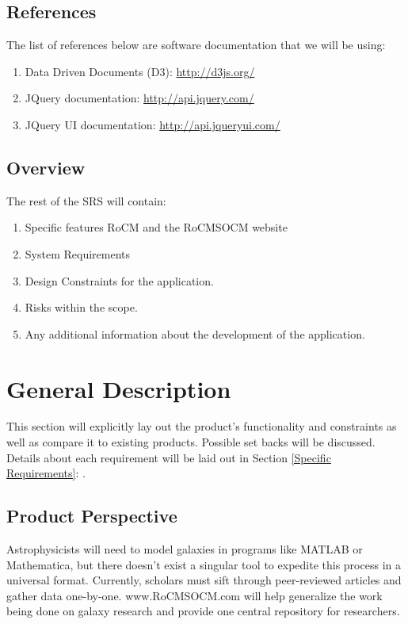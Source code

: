 \documentclass[titlepage]{article}
\begin{document}
\subsection{References}
The list of references below are software documentation that we will be using:
\begin{enumerate}
	\item Data Driven Documents (D3): \href{http://d3js.org/}{\color{blue} http://d3js.org/}
	\item JQuery documentation: \href{http://api.jquery.com/}{\color{blue} http://api.jquery.com/}
	\item JQuery UI documentation: \href{http://api.jqueryui.com/}{\color{blue} http://api.jqueryui.com/}
\end{enumerate}

\subsection{Overview}
The rest of the SRS will contain:
\begin{enumerate}
	\item Specific features RoCM and the RoCMSOCM website
	\item System Requirements
	\item Design Constraints for the application.
	\item Risks within the scope.
	\item Any additional information about the development of the application.
\end{enumerate}

\section{General Description}
This section will explicitly lay out the product's functionality and constraints as well as compare it to existing products. Possible set backs will be discussed. Details about each requirement will be laid out in Section \ref{Specific Requirements}: . 

\subsection{Product Perspective}
Astrophysicists will need to model galaxies in programs like MATLAB or Mathematica, but there doesn't exist a singular tool to expedite this process in a universal format. Currently, scholars must sift through peer-reviewed articles and gather data one-by-one. www.RoCMSOCM.com will help generalize the work being done on galaxy research and provide one central repository for researchers.
\end{document}
